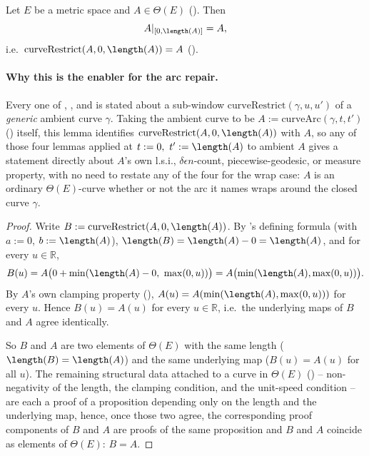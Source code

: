 \begin{lemma}
  Let $E$ be a metric space and $A \in \Theta(E)$ (). Then
  \[
    A|_{[0,\length(A)]} = A
    ,
  \]
  i.e.\ $\mathrm{curveRestrict}(A,0,\length(A)) = A$ ().

  \paragraph{Why this is the enabler for the arc repair.} Every one of
  , , 
  and  is stated about a sub-window $\mathrm{curveRestrict}(\gamma,u,u')$
  of a \emph{generic} ambient curve $\gamma$. Taking the ambient curve to be $A :=
  \mathrm{curveArc}(\gamma,t,t')$ () itself, this lemma identifies
  $\mathrm{curveRestrict}(A,0,\length(A))$ with $A$, so any of those four lemmas applied at
  $t:=0,\ t':=\length(A)$ to ambient $A$ gives a statement directly about $A$'s own l.s.i., $\delta
  \epsilon n$-count, piecewise-geodesic, or measure property, with no need to restate any of the four
  for the wrap case: $A$ is an ordinary $\Theta(E)$-curve whether or not the arc it names wraps
  around the closed curve $\gamma$.
\end{lemma}
\begin{proof}
  Write $B := \mathrm{curveRestrict}(A,0,\length(A))$. By 's defining
  formula (with $a:=0$, $b:=\length(A)$), $\length(B) = \length(A) - 0 = \length(A)$, and for every
  $u \in \mathbb{R}$,
  \[
    B(u) = A\bigl(0 + \min(\length(A)-0,\ \max(0,u))\bigr) = A\bigl(\min(\length(A),\max(0,u))\bigr)
    .
  \]
  By $A$'s own clamping property (), $A(u) = A(\min(\length(A),\max(0,u)))$ for
  every $u$. Hence $B(u) = A(u)$ for every $u \in \mathbb{R}$, i.e.\ the underlying maps of $B$ and
  $A$ agree identically.

  So $B$ and $A$ are two elements of $\Theta(E)$ with the same length ($\length(B) = \length(A)$)
  and the same underlying map ($B(u) = A(u)$ for all $u$). The remaining structural data attached
  to a curve in $\Theta(E)$ () -- non-negativity of the length, the clamping
  condition, and the unit-speed condition -- are each a proof of a proposition depending only on
  the length and the underlying map, hence, once those two agree, the corresponding proof
  components of $B$ and $A$ are proofs of the same proposition and $B$ and $A$ coincide as elements
  of $\Theta(E)$: $B = A$.
\end{proof}
